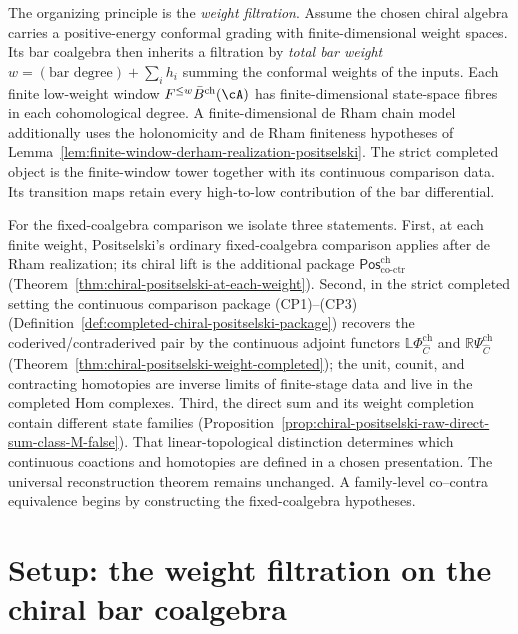 The organizing principle is the \emph{weight filtration}.  Assume the
chosen chiral algebra carries a positive-energy conformal grading
with finite-dimensional weight spaces.  Its bar coalgebra then
inherits a filtration by \emph{total bar weight}
$w = (\text{bar degree}) + \sum_i h_i$ summing the conformal weights
of the inputs. Each finite low-weight window
$F^{\leq w}\bar{B}^{\mathrm{ch}}(\cA)$ has finite-dimensional
state-space fibres in each cohomological degree.  A finite-dimensional
de Rham chain model additionally uses the holonomicity and de Rham
finiteness hypotheses of
Lemma~\ref{lem:finite-window-derham-realization-positselski}.  The
strict completed object is the finite-window tower together with its
continuous comparison data.  Its transition maps retain every
high-to-low contribution of the bar differential.

For the fixed-coalgebra comparison we isolate three statements.
First, at each finite weight, Positselski's ordinary fixed-coalgebra
comparison applies after de Rham realization; its chiral lift is the
additional package
\(\mathsf{Pos}^{\mathrm{ch}}_{\mathrm{co\text{-}ctr}}\)
(Theorem~\ref{thm:chiral-positselski-at-each-weight}). Second, in the
strict completed setting the continuous comparison package
\textup{(CP1)--(CP3)}
\textup{(}Definition~\ref{def:completed-chiral-positselski-package}\textup{)}
recovers the coderived/contraderived pair by the continuous adjoint functors
$\mathbb L\Phi^{\mathrm{ch}}_{\widehat C}$ and
$\mathbb R\Psi^{\mathrm{ch}}_{\widehat C}$
(Theorem~\ref{thm:chiral-positselski-weight-completed}); the unit,
counit, and contracting homotopies are inverse limits of finite-stage
data and live in the completed Hom complexes. Third, the direct sum
and its weight completion contain different state families
(Proposition~\ref{prop:chiral-positselski-raw-direct-sum-class-M-false}).
That linear-topological distinction determines which continuous
coactions and homotopies are defined in a chosen presentation.  The
universal reconstruction theorem remains unchanged.  A family-level
co--contra equivalence begins by constructing the fixed-coalgebra
hypotheses.

\section{Setup: the weight filtration on the chiral bar coalgebra}
\label{sec:weight-filtration-chiral-bar}

